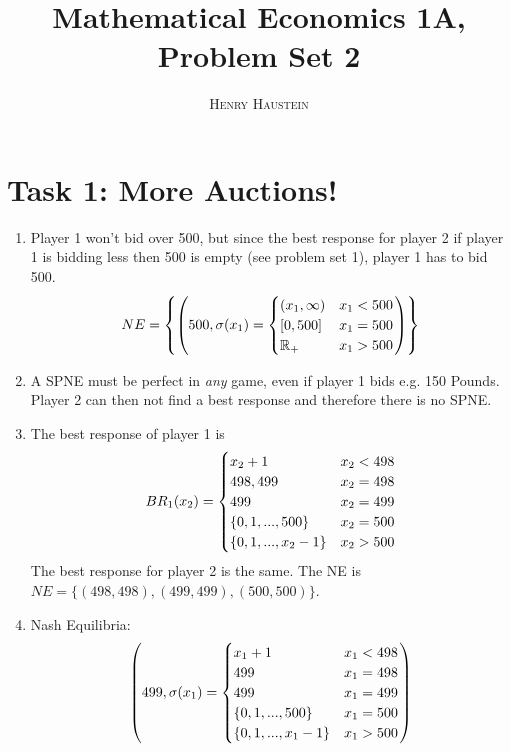 \documentclass{article}
\title{\textbf{Mathematical Economics 1A, Problem Set 2}}
\author{\textsc{Henry Haustein}}
\date{}
\begin{document}
	\maketitle
	
	\section*{Task 1: More Auctions!}
	\begin{enumerate}[label=(\alph*)]
		\item Player 1 won't bid over 500, but since the best response for player 2 if player 1 is bidding less then 500 is empty (see problem set 1), player 1 has to bid 500.
		\begin{align}
			NE = \left\lbrace\left(500, \sigma(x_1) = \begin{cases}
				(x_1, \infty) & x_1 < 500 \\
				[0,500] & x_1 = 500 \\
				\mathbb{R}_+ & x_1 > 500
			\end{cases}\right)\right\rbrace \notag
		\end{align}
		\item A SPNE must be perfect in \textit{any} game, even if player 1 bids e.g. 150 Pounds. Player 2 can then not find a best response and therefore there is no SPNE.
		\item The best response of player 1 is
		\begin{align}
			BR_1(x_2) = \begin{cases}
				x_2 + 1 & x_2 < 498 \\
				498, 499 & x_2 = 498 \\
				499 & x_2 = 499 \\
				\{0,1,...,500\} & x_2 = 500 \\
				\{0,1,...,x_2-1\} & x_2 > 500
			\end{cases} \notag
		\end{align}
		The best response for player 2 is the same. The NE is $NE = \{(498,498), (499,499), (500,500)\}$.
		\item Nash Equilibria:
		\begin{align}
			\left(499, \sigma(x_1) = \begin{cases}
				x_1 + 1 & x_1 < 498 \\
				499 & x_1 = 498 \\
				499 & x_1 = 499 \\
				\{0,1,...,500\} & x_1 = 500 \\
				\{0,1,...,x_1-1\} & x_1 > 500
			\end{cases}\right) \notag

\end{align}
\end{enumerate}
\end{document}
